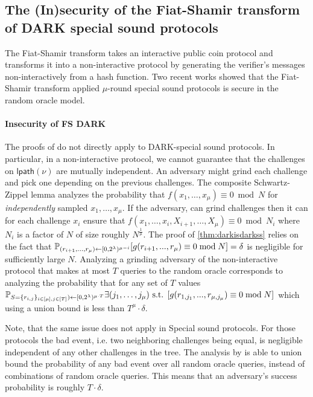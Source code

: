\subsection{The (In)security of the Fiat-Shamir transform of DARK special sound protocols}
The Fiat-Shamir transform takes an interactive public coin protocol and transforms it into a non-interactive protocol by generating the verifier's messages non-interactively from a hash function.  
Two recent works\cite{Attema,Wigstroem} showed that the Fiat-Shamir transform applied $\mu$-round special sound protocols is secure in the random oracle model.
\paragraph{Insecurity of FS DARK}
The proofs of\cite{Attema,Wigstroem} do not directly apply to DARK-special sound protocols. In particular, in a non-interactive protocol, we cannot guarantee that the challenges on $\textsf{lpath}(\nu)$ are mutually independent. An adversary might grind each challenge and pick one depending on the previous challenges. The composite Schwartz-Zippel lemma analyzes the probability that $f(x_1,\dots,x_\mu)\equiv 0 \bmod N$ for \emph{independently} sampled $x_1,\dots,x_\mu$. If the adversary, can grind challenges then it can for each challenge $x_i$ ensure that $f(x_1,\dots,x_i,X_{i+1},\dots,X_\mu)\equiv 0 \bmod N_i$ where $N_i$ is a factor of $N$ of size roughly $N^{\frac{1}{\mu}}$. The proof of \cref{thm:darkisdarkss} relies on the fact that $\mathbb{P}_{(r_{i+1},...,r_\mu) \gets [0,2^\lambda)^{\mu -i}} [g(r_{i+1},...,r_\mu)\equiv 0 \bmod N]=\delta$ is negligible for sufficiently large $N$. Analyzing a grinding adversary of the non-interactive protocol that makes at most $T$ queries to the random oracle corresponds to analyzing the probability that for any set of $T$ values $\mathbb{P}_{S=\{r_{i,j}\}_{i\in [\mu], j \in [T]}) \gets [0,2^\lambda)^{\mu \cdot T}}  \exists (j_1,\dots,j_\mu) \text{ s.t. } [g(r_{1,j_1},...,r_{\mu,j_\mu})\equiv 0 \bmod N]$ which using a union bound is less than $T^\mu \cdot \delta$.

Note, that the same issue does not apply in Special sound protocols. For those protocols the bad event, i.e. two neighboring challenges being equal, is negligible independent of any other challenges in the tree. The analysis by \cite{Attema,Wigstroem} is able to union bound the probability of any bad event over all random oracle queries, instead of combinations of random oracle queries. This means that an adversary's success probability is roughly $T\cdot \delta$.

